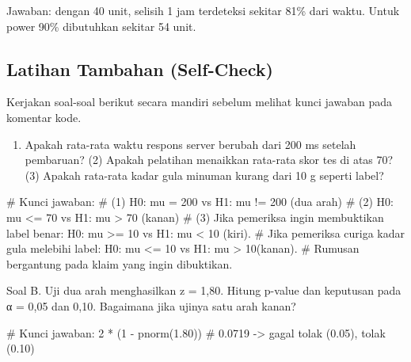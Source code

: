 \documentclass[
  indonesian,
  letterpaper,
]{book}
\newenvironment{Shaded}{\begin{snugshade}}{\end{snugshade}}
\newcommand{\CommentTok}[1]{\textcolor[rgb]{0.37,0.37,0.37}{#1}}
\newcommand{\DecValTok}[1]{\textcolor[rgb]{0.68,0.00,0.00}{#1}}
\newcommand{\FloatTok}[1]{\textcolor[rgb]{0.68,0.00,0.00}{#1}}
\newcommand{\FunctionTok}[1]{\textcolor[rgb]{0.28,0.35,0.67}{#1}}
\newcommand{\NormalTok}[1]{\textcolor[rgb]{0.00,0.23,0.31}{#1}}
\newcommand{\SpecialCharTok}[1]{\textcolor[rgb]{0.37,0.37,0.37}{#1}}
\providecommand{\tightlist}{%
  \setlength{\itemsep}{0pt}\setlength{\parskip}{0pt}}
\begin{document}
Jawaban: dengan 40 unit, selisih 1 jam terdeteksi sekitar 81\% dari
waktu. Untuk power 90\% dibutuhkan sekitar 54 unit.

\subsection{Latihan Tambahan
(Self-Check)}\label{latihan-tambahan-self-check-1}

Kerjakan soal-soal berikut secara mandiri sebelum melihat kunci jawaban
pada komentar kode.

\begin{description}
\tightlist
\item[Soal A. Tuliskan H0 dan H1]
\hfill
\begin{enumerate}
\def\labelenumi{(\arabic{enumi})}
\tightlist
\item
  Apakah rata-rata waktu respons server berubah dari 200 ms setelah
  pembaruan? (2) Apakah pelatihan menaikkan rata-rata skor tes di atas
  70? (3) Apakah rata-rata kadar gula minuman kurang dari 10 g seperti
  label?
\end{enumerate}
\end{description}

\begin{Shaded}
\begin{Highlighting}[]
\CommentTok{\# Kunci jawaban:}
\CommentTok{\# (1) H0: mu = 200 vs H1: mu != 200 (dua arah)}
\CommentTok{\# (2) H0: mu \textless{}= 70 vs H1: mu \textgreater{} 70 (kanan)}
\CommentTok{\# (3) Jika pemeriksa ingin membuktikan label benar: H0: mu \textgreater{}= 10 vs H1: mu \textless{} 10 (kiri).}
\CommentTok{\# Jika pemeriksa curiga kadar gula melebihi label: H0: mu \textless{}= 10 vs H1: mu \textgreater{} 10(kanan).}
\CommentTok{\# Rumusan bergantung pada klaim yang ingin dibuktikan.}
\end{Highlighting}
\end{Shaded}

Soal B. Uji dua arah menghasilkan z = 1,80. Hitung p-value dan keputusan
pada α = 0,05 dan 0,10. Bagaimana jika ujinya satu arah kanan?

\begin{Shaded}
\begin{Highlighting}[]
\CommentTok{\# Kunci jawaban:}
\DecValTok{2} \SpecialCharTok{*}\NormalTok{ (}\DecValTok{1} \SpecialCharTok{{-}} \FunctionTok{pnorm}\NormalTok{(}\FloatTok{1.80}\NormalTok{)) }\CommentTok{\# 0.0719 {-}\textgreater{} gagal tolak (0.05), tolak (0.10)}
\end{Highlighting}
\end{Shaded}
\end{document}
